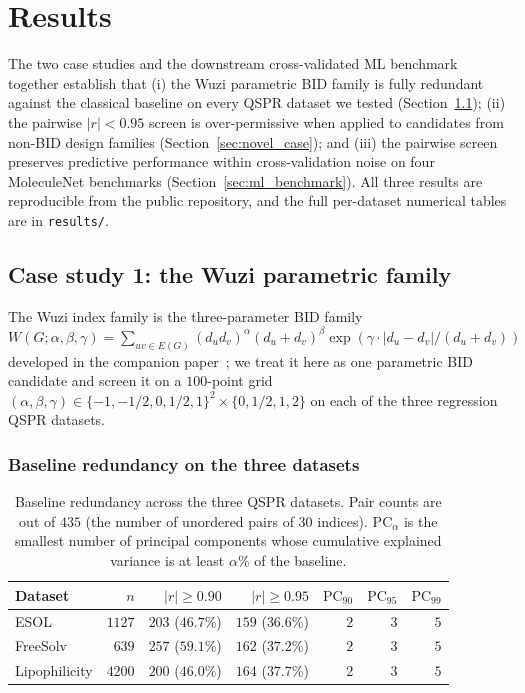 \documentclass[STIX1COL]{WileyNJDv5}
\theoremstyle{definition}
\begin{document}
\section{Results}\label{sec:results}

The two case studies and the downstream cross-validated ML
benchmark together establish that (i) the Wuzi parametric BID
family is fully redundant against the classical baseline on every
QSPR dataset we tested (Section~\ref{sec:wuzi_case}); (ii) the
pairwise $|r| < 0.95$ screen is over-permissive when applied to
candidates from non-BID design families
(Section~\ref{sec:novel_case}); and (iii) the pairwise screen
preserves predictive performance within cross-validation noise on
four MoleculeNet benchmarks (Section~\ref{sec:ml_benchmark}). All
three results are reproducible from the public repository, and
the full per-dataset numerical tables are in
\texttt{results/}.

\subsection{Case study 1: the Wuzi parametric family}\label{sec:wuzi_case}

The Wuzi index family is the three-parameter BID family
$W(G;\alpha,\beta,\gamma) = \sum_{uv\in E(G)} (d_u d_v)^\alpha (d_u + d_v)^\beta
\exp(\gamma\cdot|d_u-d_v|/(d_u+d_v))$ developed in the companion
paper~\cite{Paper1_Wuzi}; we treat it here as one parametric BID
candidate and screen it on a $100$-point grid
$(\alpha, \beta, \gamma) \in \{-1, -1/2, 0, 1/2, 1\}^2 \times \{0, 1/2, 1, 2\}$
on each of the three regression QSPR datasets.

\subsubsection{Baseline redundancy on the three datasets}

\begin{table}[h]
\centering
\small
\caption{Baseline redundancy across the three QSPR datasets. Pair counts are out of $435$ (the number of unordered pairs of $30$ indices). $\mathrm{PC}_{\alpha}$ is the smallest number of principal components whose cumulative explained variance is at least $\alpha\%$ of the baseline.}
\label{tab:baseline_redundancy}
\begin{tabular}{lrrrrrr}
\toprule
Dataset & $n$ & $\lvert r\rvert \ge 0.90$ & $\lvert r\rvert \ge 0.95$ & $\mathrm{PC}_{90}$ & $\mathrm{PC}_{95}$ & $\mathrm{PC}_{99}$\\
\midrule
ESOL          & $1127$ & $203$ ($46.7\%$) & $159$ ($36.6\%$) & $2$ & $3$ & $5$\\
FreeSolv      & $\phantom{0}639$ & $257$ ($59.1\%$) & $162$ ($37.2\%$) & $2$ & $3$ & $5$\\
Lipophilicity & $4200$ & $200$ ($46.0\%$) & $164$ ($37.7\%$) & $2$ & $3$ & $5$\\
\bottomrule
\end{tabular}
\end{table}
\end{document}
